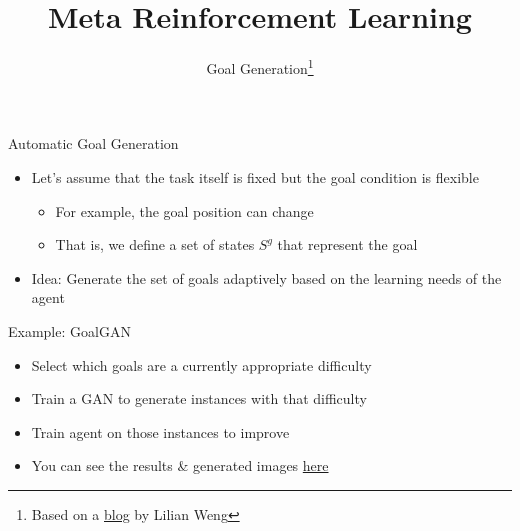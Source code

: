 


\title[Meta-RL]{Meta Reinforcement Learning}
\subtitle{Goal Generation\footnote{Based on a \href{https://lilianweng.github.io/lil-log/2020/01/29/curriculum-for-reinforcement-learning.html}{blog} by Lilian Weng}}



	
	\maketitle

\begin{frame}[c]{Automatic Goal Generation}
	
	\begin{itemize}
		\item Let's assume that the task itself is fixed but the goal condition is flexible
		\begin{itemize}
			\item For example, the goal position can change
			\item That is, we define a set of states $S^g$ that represent the goal
		\end{itemize}
		\pause
		\smallskip
		\item \alert{Idea:} Generate the set of goals adaptively based on the learning needs of the agent
	\end{itemize}
	
\end{frame}
\begin{frame}[c]{Example: GoalGAN }
	
	\begin{itemize}
		\item Select which goals are a currently appropriate difficulty
		\item Train a GAN to generate instances with that difficulty
		\item Train agent on those instances to improve
		\item You can see the results \& generated images \href{https://sites.google.com/view/goalgeneration4rl}{here}
	\end{itemize}
	
\end{frame}
